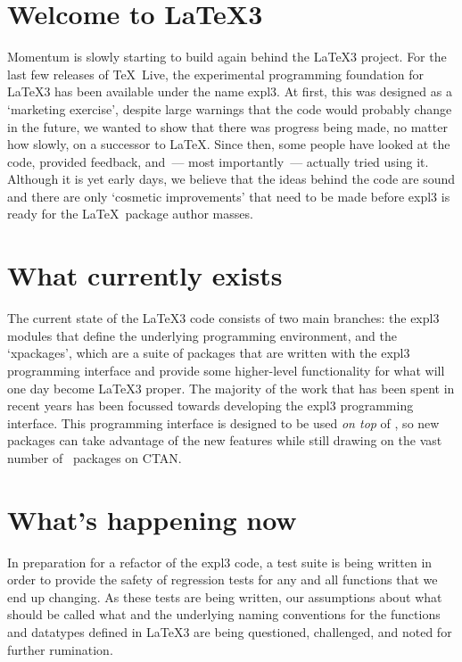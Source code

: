 \documentclass{ltnews}
\begin{document}
 
\maketitle

\section{Welcome to \LaTeX3}

Momentum is slowly starting to build again behind the \LaTeX3 project. For the last few releases of \TeX~Live, the experimental programming foundation for \LaTeX3 has been available under the name \textsf{expl3}. At first, this was designed as a `marketing exercise', despite large warnings that the code would probably change in the future, we wanted to show that there was progress being made, no matter how slowly, on a successor to \LaTeX. Since then, some people have looked at the code, provided feedback, and~--- most importantly~--- actually tried using it. Although it is yet early days, we believe that the ideas behind the code are sound and there are only `cosmetic improvements' that need to be made before \textsf{expl3} is ready for the \LaTeX~package author masses.

\section{What currently exists}

The current state of the \LaTeX3 code consists of two main branches: the \textsf{expl3} modules that define the underlying programming environment, and the `\textsf{xpackage}s', which are a suite of packages that are written with the \textsf{expl3} programming interface and provide some higher-level functionality for what will one day become \LaTeX3 proper. The majority of the work that has been spent in recent years has been focussed towards developing the \textsf{expl3} programming interface. This programming interface is designed to be used \emph{on top} of \LaTeXe, so new packages can take advantage of the new features while still drawing on the vast number of \LaTeXe\ packages on CTAN.

\section{What's happening now}

In preparation for a refactor of the \textsf{expl3} code, a test suite is being written in order to provide the safety of regression tests for any and all functions that we end up changing. As these tests are being written, our assumptions about what should be called what and the underlying naming conventions for the functions and datatypes defined in \LaTeX3 are being questioned, challenged, and noted for further rumination.
\end{document}
